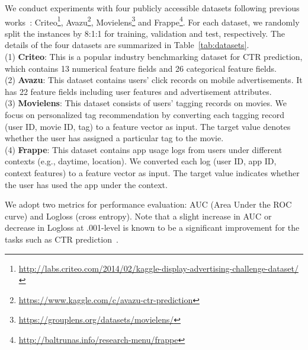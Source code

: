 \documentclass[letterpaper]{article} \usepackage{aaai20}  \usepackage{times}  \usepackage{helvet} \usepackage{courier}  \usepackage[hyphens]{url}  \usepackage{graphicx} \urlstyle{rm} \def\UrlFont{\rm}  \usepackage{graphicx}  \frenchspacing  \setlength{\pdfpagewidth}{8.5in}  \setlength{\pdfpageheight}{11in}
\begin{document}
We conduct experiments with four publicly accessible datasets following previous works~\cite{xDeepFM,nfm}: Criteo\footnote{\small{\url{http://labs.criteo.com/2014/02/kaggle-display-advertising-challenge-dataset/}}}, Avazu\footnote{\small\url{https://www.kaggle.com/c/avazu-ctr-prediction}}, Movielens\footnote{\small\url{https://grouplens.org/datasets/movielens/}} and Frappe\footnote{\small\url{http://baltrunas.info/research-menu/frappe}}. For each dataset, we randomly split the instances by 8:1:1 for training, validation and test, respectively. The details of the four datasets are summarized in Table~\ref{tab:datasets}.\\
{(1) \bf Criteo}: This is a popular industry benchmarking dataset for CTR prediction, which contains 13 numerical feature fields and 26 categorical feature fields.\\
{(2) \bf Avazu}: This dataset contains users' click records on mobile advertisements. It has 22 feature fields including user features and advertisement attributes.\\
{(3) \bf Movielens}: This dataset consists of users' tagging records on movies. We focus on personalized tag recommendation by converting each tagging record (user ID, movie ID, tag) to a feature vector as input. The target value denotes whether the user has assigned a particular tag to the movie.\\
{(4) \bf Frappe}:  
This dataset contains app usage logs from users under different contexts (e.g., daytime, location). We converted each log (user ID, app ID, context features) to a feature vector as input. The target value indicates whether the user has used the app under the context.

We adopt two metrics for performance evaluation: AUC (Area Under the ROC curve) and Logloss (cross entropy). Note that a slight increase in AUC or decrease in Logloss at .001-level is known to be a significant improvement for the tasks such as CTR prediction~\cite{wide_and_deep,DeepFM,song2018autoint}. 
\end{document}
